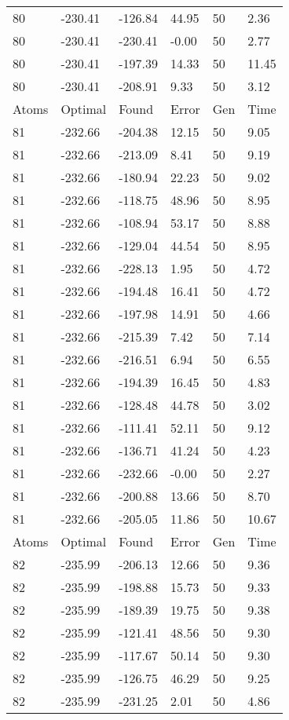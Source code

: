 \documentclass{report}
\begin{document}
\begin{appendix}
\begin{longtable}{llllll}
80 & -230.41 & -126.84 & 44.95 & 50 & 2.36 \\
80 & -230.41 & -230.41 & -0.00 & 50 & 2.77 \\
80 & -230.41 & -197.39 & 14.33 & 50 & 11.45 \\
80 & -230.41 & -208.91 & 9.33 & 50 & 3.12 \\
Atoms & Optimal & Found & Error & Gen & Time \\
81 & -232.66 & -204.38 & 12.15 & 50 & 9.05 \\
81 & -232.66 & -213.09 & 8.41 & 50 & 9.19 \\
81 & -232.66 & -180.94 & 22.23 & 50 & 9.02 \\
81 & -232.66 & -118.75 & 48.96 & 50 & 8.95 \\
81 & -232.66 & -108.94 & 53.17 & 50 & 8.88 \\
81 & -232.66 & -129.04 & 44.54 & 50 & 8.95 \\
81 & -232.66 & -228.13 & 1.95 & 50 & 4.72 \\
81 & -232.66 & -194.48 & 16.41 & 50 & 4.72 \\
81 & -232.66 & -197.98 & 14.91 & 50 & 4.66 \\
81 & -232.66 & -215.39 & 7.42 & 50 & 7.14 \\
81 & -232.66 & -216.51 & 6.94 & 50 & 6.55 \\
81 & -232.66 & -194.39 & 16.45 & 50 & 4.83 \\
81 & -232.66 & -128.48 & 44.78 & 50 & 3.02 \\
81 & -232.66 & -111.41 & 52.11 & 50 & 9.12 \\
81 & -232.66 & -136.71 & 41.24 & 50 & 4.23 \\
81 & -232.66 & -232.66 & -0.00 & 50 & 2.27 \\
81 & -232.66 & -200.88 & 13.66 & 50 & 8.70 \\
81 & -232.66 & -205.05 & 11.86 & 50 & 10.67 \\
Atoms & Optimal & Found & Error & Gen & Time \\
82 & -235.99 & -206.13 & 12.66 & 50 & 9.36 \\
82 & -235.99 & -198.88 & 15.73 & 50 & 9.33 \\
82 & -235.99 & -189.39 & 19.75 & 50 & 9.38 \\
82 & -235.99 & -121.41 & 48.56 & 50 & 9.30 \\
82 & -235.99 & -117.67 & 50.14 & 50 & 9.30 \\
82 & -235.99 & -126.75 & 46.29 & 50 & 9.25 \\
82 & -235.99 & -231.25 & 2.01 & 50 & 4.86 \\

\end{longtable}
\end{appendix}
\end{document}
